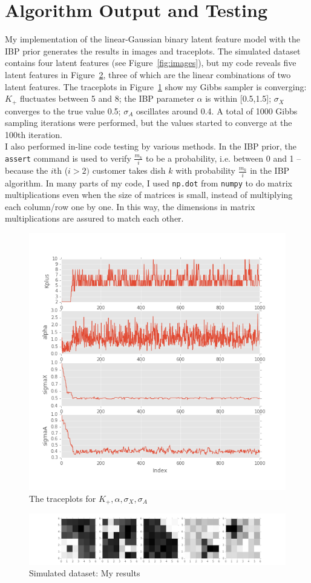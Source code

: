 \section{Algorithm Output and Testing}
My implementation of the linear-Gaussian binary latent feature model with the IBP prior generates the results in images and traceplots. The simulated dataset contains four latent features (see Figure~\ref{fig:images}), but my code reveals five latent features in Figure~\ref{fig:imageresults}, three of which are the linear combinations of two latent features. The traceplots in Figure~\ref{fig:plotresults} show my Gibbs sampler is converging: $K_+$ fluctuates between 5 and 8; the IBP parameter $\alpha$ is within [0.5,1.5]; $\sigma_X$ converges to the true value 0.5; $\sigma_A$ oscillates around 0.4. A total of 1000 Gibbs sampling iterations were performed, but the values started to converge at the 100th iteration.\\

I also performed in-line code testing by various methods. In the IBP prior, the \texttt{assert} command is used to verify $\frac{m_k}{i}$ to be a probability, i.e. between 0 and 1 -- because the $i$th ($i > 2)$ customer takes dish $k$ with probability $\frac{m_k}{i}$ in the IBP algorithm. In many parts of my code, I used \texttt{np.dot} from \texttt{numpy} to do matrix multiplications even when the size of matrices is small, instead of multiplying each column/row one by one. In this way, the dimensions in matrix multiplications are assured to match each other.

\begin{figure}[!ht]
\centering
    \includegraphics[width=0.65\linewidth]{IBP_plot_results.png}
    \vspace{-20pt}
    \caption{The traceplots for $K_+, \alpha, \sigma_X, \sigma_A$}
    \label{fig:plotresults}
\end{figure}

\begin{figure}[!ht]
\centering
    \includegraphics[width=\linewidth]{IBP_image_results.png}
    \caption{Simulated dataset: My results}
    \label{fig:imageresults}
\end{figure}